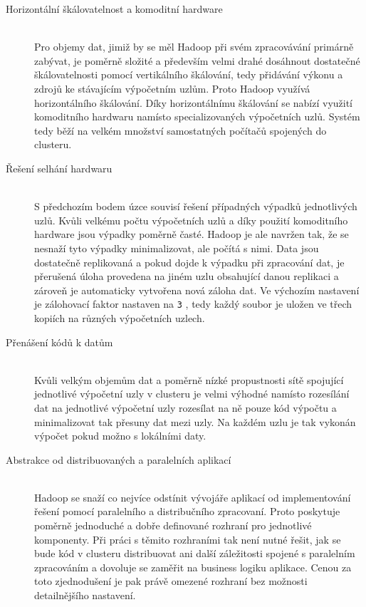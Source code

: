 \documentclass[thesis=M,czech]{FITthesis}[2012/06/26]
\begin{document}
\begin{description}

  \item[Horizontální škálovatelnost a komoditní hardware] \hfill \\
  Pro objemy dat, jimiž by se měl Hadoop při svém zpracovávání primárně zabývat, je poměrně složité a především velmi drahé dosáhnout dostatečné škálovatelnosti pomocí vertikálního škálování, tedy přidávání výkonu a zdrojů ke stávajícím výpočetním uzlům. Proto Hadoop využívá horizontálního škálování. Díky horizontálnímu škálování se nabízí využití komoditního hardwaru namísto specializovaných výpočetních uzlů. Systém tedy běží na velkém množství samostatných počítačů spojených do clusteru.
  \item[Řešení selhání hardwaru] \hfill \\
   S předchozím bodem úzce souvisí řešení případných výpadků jednotlivých uzlů. Kvůli velkému počtu výpočetních uzlů a díky použití komoditního hardware jsou výpadky poměrně časté. Hadoop je ale navržen tak, že se nesnaží tyto výpadky minimalizovat, ale počítá s nimi. Data jsou dostatečně replikovaná a pokud dojde k výpadku při zpracování dat, je přerušená úloha provedena na jiném uzlu obsahující danou replikaci a zároveň je automaticky vytvořena nová záloha dat. Ve výchozím nastavení je zálohovací faktor nastaven na {\texttt{3}} , tedy každý soubor je uložen ve třech kopiích na různých výpočetních uzlech.  
  \item[Přenášení kódů k datům] \hfill \\
  Kvůli velkým objemům dat a poměrně nízké propustnosti sítě spojující jednotlivé výpočetní uzly v clusteru je velmi výhodné namísto rozesílání dat na jednotlivé výpočetní uzly rozesílat na ně pouze kód výpočtu a minimalizovat tak přesuny dat mezi uzly. Na každém uzlu je tak vykonán výpočet pokud možno s lokálními daty.
  \item[Abstrakce od distribuovaných a paralelních aplikací] \hfill \\
  Hadoop se snaží co nejvíce odstínit vývojáře aplikací od implementování řešení pomocí paralelního a distribučního zpracovaní. Proto poskytuje poměrně jednoduché a dobře definované rozhraní pro jednotlivé komponenty. Při práci s těmito rozhraními tak není nutné řešit, jak se bude kód v clusteru distribuovat ani další záležitosti spojené s paralelním zpracováním a dovoluje se zaměřit na business logiku aplikace. Cenou za toto zjednodušení je pak právě omezené rozhraní bez možnosti detailnějšího nastavení. 

\end{description}
\end{document}
